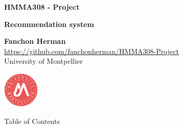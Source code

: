 \documentclass[unknownkeysallowed]{beamer}
\begin{document}



\begin{frame}
\bigskip
\bigskip
\begin{center}{
\LARGE\color{marron}
\textbf{HMMA308 - Project}
\textbf{ }\\
\vspace{0.5cm}
}

\color{marron}
\textbf{Recommendation system}
\end{center}

\vspace{0.5cm}

\begin{center}
\textbf{Fanchon Herman} \\
\vspace{0.1cm}
\url{https://github.com/fanchonherman/HMMA308-Project}\\
\vspace{0.5cm}
University of Montpellier \\
\end{center}

\centering
\includegraphics[width=0.13\textwidth]{./images/Logo}

\end{frame}





\begin{frame}{Table of Contents}
\tableofcontents
\end{frame}
\end{document}
